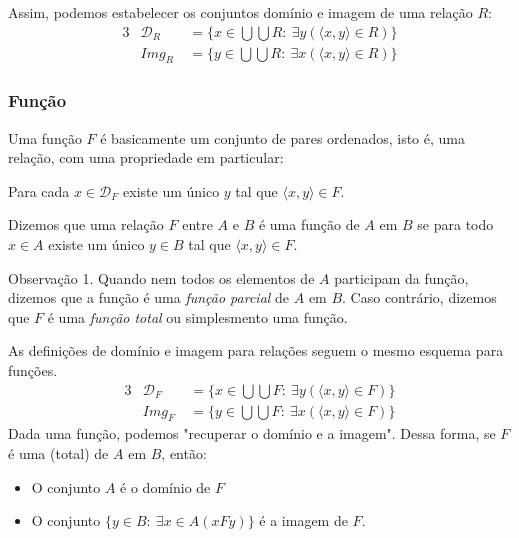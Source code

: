          Assim, podemos estabelecer os conjuntos domínio e imagem de uma relação $R$:
         \begin{alignat*}{3}
            & \mathcal{D}_{R}& \ = \{x \in \bigcup \bigcup R:\ \exists y (\langle x, y \rangle \in R) \}\\
            & \mathit{Img}_{R}& \ = \{y \in \bigcup \bigcup R:\ \exists x (\langle x, y \rangle \in R)\}
         \end{alignat*}

      \subsubsection{Função}
         Uma função $F$ é basicamente um conjunto de pares ordenados, isto é, uma relação, com uma propriedade em particular:
         \begin{stat}
            Para cada $x \in \mathcal{D}_{F}$ existe um único $y$ tal que $\langle x, y \rangle \in F.$
         \end{stat}
         \begin{definition}
            Dizemos que uma relação $F$ entre $A$ e $B$ é uma função de $A$ em $B$ se para todo $x \in A$ existe um único $y \in B$ tal que $\langle x, y \rangle \in F.$ 
         \end{definition}
         \begin{mymdframed}{Observação 1.}
            Quando nem todos os elementos de $A$ participam da função, dizemos que a função é uma \textit{função parcial} de $A$ em $B$. Caso contrário, dizemos que $F$ é uma \textit{função total} ou simplesmento uma função.
         \end{mymdframed}
         As definições de domínio e imagem para relações seguem o mesmo esquema para funções.
         \begin{alignat*}{3}
            & \mathcal{D}_{F}& \ = \{x \in \bigcup \bigcup F:\ \exists y (\langle x, y \rangle \in F) \}\\
            & \mathit{Img}_{F}& \ = \{y \in \bigcup \bigcup F:\ \exists x (\langle x, y \rangle \in F)\}
         \end{alignat*}
         Dada uma função, podemos "recuperar o domínio e a imagem". Dessa forma, se $F$ é uma (total) de $A$ em $B$, então:
         \begin{itemize}
            \item O conjunto $A$ é o domínio de $F$
            \item O conjunto $\{y \in B:\ \exists x \in A(xFy)\}$ é a imagem de $F.$
         \end{itemize}
